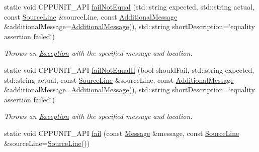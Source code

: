 \begin{DoxyCompactItemize}
\item 
static void C\+P\+P\+U\+N\+I\+T\+\_\+\+A\+P\+I \hyperlink{struct_asserter_a661792ac0a89f597d81582f736b0096e}{fail\+Not\+Equal} (std\+::string expected, std\+::string actual, const \hyperlink{class_source_line}{Source\+Line} \&source\+Line, const \hyperlink{class_additional_message}{Additional\+Message} \&additional\+Message=\hyperlink{class_additional_message}{Additional\+Message}(), std\+::string short\+Description=\char`\"{}equality assertion failed\char`\"{})
\begin{DoxyCompactList}\small\item\em Throws an \hyperlink{class_exception}{Exception} with the specified message and location. \end{DoxyCompactList}\item 
static void C\+P\+P\+U\+N\+I\+T\+\_\+\+A\+P\+I \hyperlink{struct_asserter_a71143b0ea2e48e4089a018938125da73}{fail\+Not\+Equal\+If} (bool should\+Fail, std\+::string expected, std\+::string actual, const \hyperlink{class_source_line}{Source\+Line} \&source\+Line, const \hyperlink{class_additional_message}{Additional\+Message} \&additional\+Message=\hyperlink{class_additional_message}{Additional\+Message}(), std\+::string short\+Description=\char`\"{}equality assertion failed\char`\"{})
\begin{DoxyCompactList}\small\item\em Throws an \hyperlink{class_exception}{Exception} with the specified message and location. \end{DoxyCompactList}\item 
\hypertarget{struct_asserter_a5a67b6042625cc87d271a53ac555e437}{static void C\+P\+P\+U\+N\+I\+T\+\_\+\+A\+P\+I \hyperlink{struct_asserter_a5a67b6042625cc87d271a53ac555e437}{fail} (const \hyperlink{class_message}{Message} \&message, const \hyperlink{class_source_line}{Source\+Line} \&source\+Line=\hyperlink{class_source_line}{Source\+Line}())}\label{struct_asserter_a5a67b6042625cc87d271a53ac555e437}


\end{DoxyCompactItemize}
